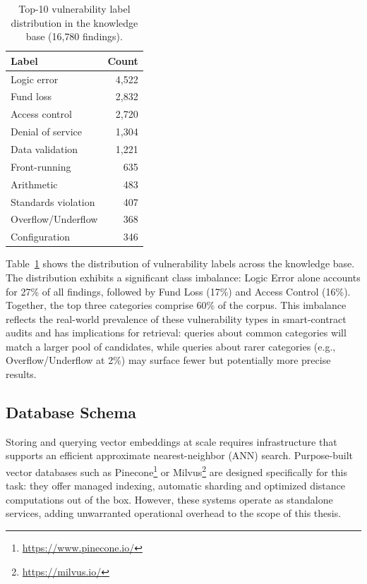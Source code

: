 \begin{table}[!ht]
\centering
\begin{tabular}{lr}
\toprule
\textbf{Label} & \textbf{Count} \\
\midrule
Logic error & 4{,}522 \\
Fund loss & 2{,}832 \\
Access control & 2{,}720 \\
Denial of service & 1{,}304 \\
Data validation & 1{,}221 \\
Front-running & 635 \\
Arithmetic & 483 \\
Standards violation & 407 \\
Overflow/Underflow & 368 \\
Configuration & 346 \\
\bottomrule
\end{tabular}
\caption[Vulnerability labels.]{Top-10 vulnerability label distribution in the knowledge base (16{,}780 findings).}
\label{tab:label-dist}
\end{table}

Table~\ref{tab:label-dist} shows the distribution of vulnerability labels across the knowledge base. The distribution exhibits a significant class imbalance: Logic Error alone accounts for 27\% of all findings, followed by Fund Loss (17\%) and Access Control (16\%). Together, the top three categories comprise 60\% of the corpus. This imbalance reflects the real-world prevalence of these vulnerability types in smart-contract audits and has implications for retrieval: queries about common categories will match a larger pool of candidates, while queries about rarer categories (e.g., Overflow/Underflow at 2\%) may surface fewer but potentially more precise results.

\subsection{Database Schema}
\label{subsec:db-schema}

Storing and querying vector embeddings at scale requires infrastructure that supports an efficient approximate nearest-neighbor (ANN) search. Purpose-built vector databases such as Pinecone\footnote{\url{https://www.pinecone.io/}} or Milvus\footnote{\url{https://milvus.io/}} are designed specifically for this task: they offer managed indexing, automatic sharding and optimized distance computations out of the box. However, these systems operate as standalone services, adding unwarranted operational overhead to the scope of this thesis.

